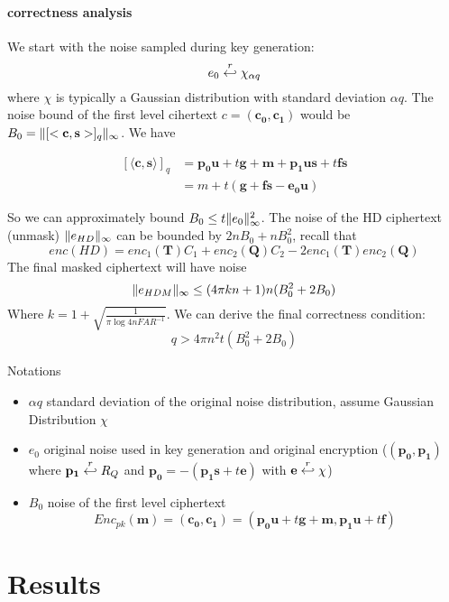 \paragraph{correctness analysis}
We start with the noise sampled during key generation:
\[e_{0} \stackrel{r}{\hookleftarrow} \chi_{\alpha q}\] where \(\chi\) is typically a Gaussian
distribution with standard deviation \(\alpha q\). The noise bound of the first
level cihertext \(c = (\mathbf{c_{0}, c_{1}})\) would be
\(B_{0} = \Vert [<\mathbf{c,s}>]_{q} \Vert_{\infty}\). We have

\begin{align*}
  \left[ \langle \mathbf{c, s} \rangle \right]_{q} &= \mathbf{p_{0}u} + t \mathbf{g} + \mathbf{m} + \mathbf{p_{1}us} + t \mathbf{fs}\\
                                                   &= m + t(\mathbf{g + fs -e_{0}u})
\end{align*}

So we can approximately bound \(B_{0} \leq t \Vert e_{0} \Vert_{\infty}^{2}\). The noise of
the HD ciphertext (unmask) \(\Vert e_{HD} \Vert_{\infty}\) can be bounded by
\(2nB_{0} + n B_{0}^{2}\), recall that
\[
  enc(HD) = enc_{1}(\mathbf{T})C_{1} + enc_{2}(\mathbf{Q})C_{2} - 2
  enc_{1}(\mathbf{T})enc_{2}(\mathbf{Q})
\]
The final masked ciphertext will have noise
\[
\Vert e_{HDM} \Vert_{\infty} \leq (4\pi kn + 1)n(B_{0}^{2} + 2B_{0})
\]
Where \(k = 1 + \sqrt{\frac{1}{\pi \log{4n FAR^{-1}}}}\). We can derive the
final correctness condition:
\[
q > 4 \pi n^{2} t (B_{0}^{2} + 2B_{0})
\]

Notations
\begin{itemize}
\item \(\alpha q\) standard deviation of the original noise distribution, assume
  Gaussian Distribution \(\chi\)
\item \(e_{0}\) original noise used in key generation and original encryption
  ($(\mathbf{p_0},\mathbf{p_1})$ where $\mathbf{p_1} \stackrel{r}{\hookleftarrow} R_Q$ and
  $\mathbf{p_0} = -(\mathbf{p_1}\mathbf{s} + t\mathbf{e})$ with
  $\mathbf{e} \stackrel{r}{\hookleftarrow} \chi$)
\item \(B_{0}\) noise of the first level ciphertext
  \[
    Enc_{pk}(\mathbf{m}) = (\mathbf{c_0},\mathbf{c_1}) = (\mathbf{p_0}\mathbf{u}
    + t\mathbf{g} + \mathbf{m}, \mathbf{p_1}\mathbf{u} + t\mathbf{f})
  \]
\end{itemize}
  
 


\section{Results}
\label{sec:secProcResult}


    

